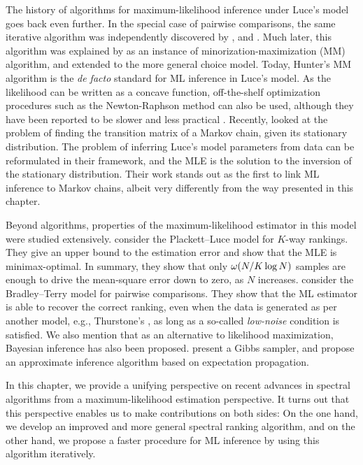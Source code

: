 The history of algorithms for maximum-likelihood inference under Luce's model goes back even further.
In the special case of pairwise comparisons, the same iterative algorithm was independently discovered by \citet{zermelo1928berechnung}, \citet{ford1957solution} and \citet{dykstra1960rank}.
Much later, this algorithm was explained by \citet{hunter2004mm} as an instance of minorization-maximization (MM) algorithm, and extended to the more general choice model.
Today, Hunter's MM algorithm is the \emph{de facto} standard for ML inference in Luce's model.
As the likelihood can be written as a concave function, off-the-shelf optimization procedures such as the Newton-Raphson method can also be used, although they have been reported to be slower and less practical \citep{hunter2004mm}.
Recently, \citet{kumar2015inverting} looked at the problem of finding the transition matrix of a Markov chain, given its stationary distribution.
The problem of inferring Luce's model parameters from data can be reformulated in their framework, and the MLE is the solution to the inversion of the stationary distribution.
Their work stands out as the first to link ML inference to Markov chains, albeit very differently from the way presented in this chapter.

Beyond algorithms, properties of the maximum-likelihood estimator in this model were studied extensively.
\citet{hajek2014minimax} consider the Plackett--Luce model for $K$-way rankings.
They give an upper bound to the estimation error and show that the MLE is minimax-optimal.
In summary, they show that only $\omega(N/K \log N)$ samples are enough to drive the mean-square error down to zero, as $N$ increases.
\citet{rajkumar2014statistical} consider the Bradley--Terry model for pairwise comparisons.
They show that the ML estimator is able to recover the correct ranking, even when the data is generated as per another model, e.g., Thurstone's \citep{thurstone1927method}, as long as a so-called \emph{low-noise} condition is satisfied.
We also mention that as an alternative to likelihood maximization, Bayesian inference has also been proposed.
\citet{caron2012efficient} present a Gibbs sampler, and \citet{guiver2009bayesian} propose an approximate inference algorithm based on expectation propagation.

In this chapter, we provide a unifying perspective on recent advances in spectral algorithms \citep{negahban2012iterative, azari2013generalized} from a maximum-likelihood estimation perspective.
It turns out that this perspective enables us to make contributions on both sides:
On the one hand, we develop an improved and more general spectral ranking algorithm, and on the other hand, we propose a faster procedure for ML inference by using this algorithm iteratively.
